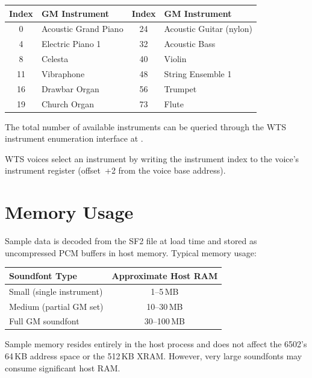 \begin{center}
\small
\begin{tabular}{@{}cl@{\qquad}cl@{}}
\toprule
\textbf{Index} & \textbf{GM Instrument} &
\textbf{Index} & \textbf{GM Instrument} \\
\midrule
0   & Acoustic Grand Piano & 24  & Acoustic Guitar (nylon) \\
4   & Electric Piano 1     & 32  & Acoustic Bass \\
8   & Celesta              & 40  & Violin \\
11  & Vibraphone           & 48  & String Ensemble 1 \\
16  & Drawbar Organ        & 56  & Trumpet \\
19  & Church Organ         & 73  & Flute \\
\bottomrule
\end{tabular}
\end{center}

The total number of available instruments can be queried through the WTS
instrument enumeration interface at .

WTS voices select an instrument by writing the instrument index to the voice's
instrument register (offset~+2 from the voice base address).


\section{Memory Usage}
\label{sec:wts-memory}

Sample data is decoded from the SF2 file at load time and stored as uncompressed
PCM buffers in host memory.  Typical memory usage:

\begin{center}
\small
\begin{tabular}{@{}lc@{}}
\toprule
\textbf{Soundfont Type} & \textbf{Approximate Host RAM} \\
\midrule
Small (single instrument)  & 1--5\,MB \\
Medium (partial GM set)    & 10--30\,MB \\
Full GM soundfont          & 30--100\,MB \\
\bottomrule
\end{tabular}
\end{center}

\begin{warningbox}
Sample memory resides entirely in the host process and does not affect the
6502's 64\,KB address space or the 512\,KB XRAM.  However, very large soundfonts
may consume significant host RAM.
\end{warningbox}


